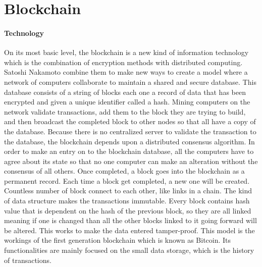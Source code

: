 \documentclass [12pt]{report}
\begin{document}
\section{Blockchain}
\paragraph{Technology}
On its most basic level, 
the blockchain is a new kind of information technology 
which is the combination of encryption methods with distributed computing.
Satoshi Nakamoto \cite{nakamoto2008bitcoin} combine them to make new ways to create a model 
where a network of computers collaborate to maintain a shared and secure database. 
This database consists of a string of blocks each one a record of data 
that has been encrypted and given a unique identifier called a hash.
Mining computers on the network validate transactions, 
add them to the block they are trying to build, 
and then broadcast the completed block to other nodes 
so that all have a copy of the database. 
Because there is no centralized server to validate the transaction to the database,
the blockchain depends upon a distributed consensus algorithm. 
In order to make an entry on to the blockchain database, 
all the computers have to agree about its state 
so that no one computer can make an alteration without the consensus of all others.
Once completed, a block goes into the blockchain as a permanent record. Each time a block get completed, a new one will be created.
Countless number of block connect to each other, like links in a chain. The kind of data structure makes the transactions immutable.
Every block contains hash value that is dependent on the hash of the previous block, 
so they are all linked meaning if one is changed than all the other blocks linked to it going forward will be altered.
This works to make the data entered tamper-proof. 
This model is the workings of the first generation blockchain which is known as Bitcoin.
Its functionalities are mainly focused on the small data storage, which is the history of transactions.
\end{document}
